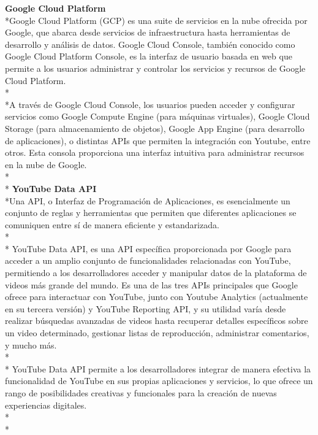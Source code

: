 \documentclass[a4paper,12pt,twoside]{memoir}
\begin{document}
\textbf{Google Cloud Platform}\\*Google Cloud Platform (GCP) es una suite de servicios en la nube ofrecida por Google, que abarca desde servicios de infraestructura hasta herramientas de desarrollo y análisis de datos. Google Cloud Console, también conocido como Google Cloud Platform Console, es la interfaz de usuario basada en web que permite a los usuarios administrar y controlar los servicios y recursos de Google Cloud Platform.\\*\\*A través de Google Cloud Console, los usuarios pueden acceder y configurar servicios como Google Compute Engine (para máquinas virtuales), Google Cloud Storage (para almacenamiento de objetos), Google App Engine (para desarrollo de aplicaciones), o distintas APIs que permiten la integración con Youtube, entre otros. Esta consola proporciona una interfaz intuitiva para administrar recursos en la nube de Google\cite{geewax2018google}.\\*\\*
\textbf{YouTube Data API}\\*Una API, o Interfaz de Programación de Aplicaciones, es esencialmente un conjunto de reglas y herramientas que permiten que diferentes aplicaciones se comuniquen entre sí de manera eficiente y estandarizada. \\*\\* YouTube Data API, es una API específica proporcionada por Google para acceder a un amplio conjunto de funcionalidades relacionadas con YouTube, permitiendo a los desarrolladores acceder y manipular datos de la plataforma de videos más grande del mundo. Es una de las tres APIs principales que Google ofrece para interactuar con YouTube, junto con Youtube Analytics (actualmente en su tercera versión) y YouTube Reporting API, y su utilidad varía desde realizar búsquedas avanzadas de videos hasta recuperar detalles específicos sobre un video determinado, gestionar listas de reproducción, administrar comentarios, y mucho más. \\*\\* YouTube Data API permite a los desarrolladores integrar de manera efectiva la funcionalidad de YouTube en sus propias aplicaciones y servicios, lo que ofrece un rango de posibilidades creativas y funcionales para la creación de nuevas experiencias digitales\cite{youtube_data_api_doc}.\\*\\*
\end{document}
